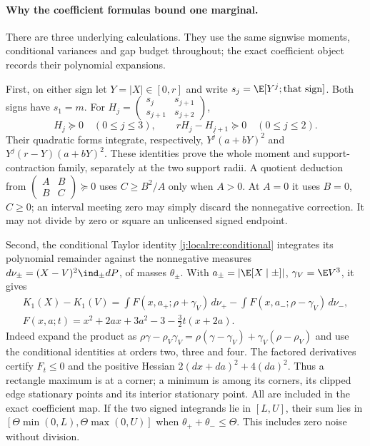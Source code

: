 \paragraph{Why the coefficient formulas bound one marginal.}
There are three underlying calculations. They use the same signwise
moments, conditional variances and gap budget throughout; the exact
coefficient object records their polynomial expansions.

First, on either sign let $Y=|X|\in[0,r]$ and write
$s_j=\E[Y^j;\text{that sign}]$. Both signs have $s_1=m$.
For $H_j=\left(\begin{smallmatrix}s_j&s_{j+1}\\s_{j+1}&s_{j+2}\end{smallmatrix}\right)$,
\[
 H_j\succeq0\quad(0\le j\le3),\qquad
 rH_j-H_{j+1}\succeq0\quad(0\le j\le2).
\]
Their quadratic forms integrate, respectively,
$Y^j(a+bY)^2$ and $Y^j(r-Y)(a+bY)^2$. These identities prove the
whole moment and support-contraction family, separately at the two
support radii. A quotient deduction from
$\left(\begin{smallmatrix}A&B\\B&C\end{smallmatrix}\right)\succeq0$
uses $C\ge B^2/A$ only when $A>0$. At $A=0$ it uses $B=0$, $C\ge0$;
an interval meeting zero may simply discard the nonnegative correction.
It may not divide by zero or square an unlicensed signed endpoint.

Second, the conditional Taylor identity
\eqref{j:local:re:conditional} integrates its polynomial remainder
against the nonnegative measures
$d\nu_\pm=(X-V)^2\ind_\pm dP$, of masses $\theta_\pm$.
With $a_\pm=|\E[X\mid\pm]|$, $\gamma_V=\E V^3$, it gives
\begin{gather*}
 K_1(X)-K_1(V)=
 \int F(x,a_+;\rho+\gamma_V)\,d\nu_+
 -\int F(x,a_-;\rho-\gamma_V)\,d\nu_-,\\
 F(x,a;t)=x^2+2ax+3a^2-3-\tfrac32t(x+2a).
\end{gather*}
Indeed expand the product as
$\rho\gamma-\rho_V\gamma_V=\rho(\gamma-\gamma_V)
+\gamma_V(\rho-\rho_V)$ and use the conditional identities at orders
two, three and four. The factored derivatives certify $F_t\le0$ and
the positive Hessian $2(dx+da)^2+4(da)^2$.
Thus a rectangle maximum is at a corner; a minimum is among its corners,
its clipped edge stationary points and its interior stationary point.
All are included in the exact coefficient map. If the two signed
integrands lie in $[L,U]$, their sum lies in
$[\Theta\min(0,L),\Theta\max(0,U)]$ when
$\theta_++\theta_-\le\Theta$. This includes zero noise without division.

